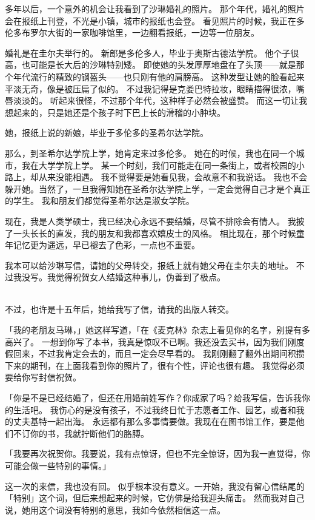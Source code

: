 \documentclass[UTF8]{ctexart}
\begin{document}
多年以后，一个意外的机会让我看到了沙琳婚礼的照片。
那个年代，婚礼的照片会在报纸上刊登，不光是小镇，城市的报纸也会登。
看见照片的时候，我正在多伦多布罗尔大街的一家咖啡馆里，一边翻看报纸，一边等一位朋友。

婚礼是在圭尔夫举行的。
新郎是多伦多人，毕业于奥斯古德法学院。
他个子很高，也可能是长大后的沙琳特别矮。
即使她的头发厚厚地盘在了头顶——就是那个年代流行的精致的钢盔头——也只刚有他的肩膀高。
这种发型让她的脸看起来平淡无奇，像是被压扁了似的。
不过我记得是克娄巴特拉妆，眼睛描得很浓，嘴唇淡淡的。
听起来很怪，不过那个年代，这种样子必然会被盛赞。
而这一切让我想起来的，只是她还是个孩子时下巴上长的滑稽的小肿块。

她，报纸上说的新娘，毕业于多伦多的圣希尔达学院。

那么，到圣希尔达学院上学，她肯定来过多伦多。
她在的时候，我也在同一个城市，我在大学学院上学。
某一个时刻，我们可能走在同一条街上，或者校园的小路上，却从来没能相遇。
我不觉得要是她看见我，会故意不和我说话。
我也不会躲开她。当然了，一旦我得知她在圣希尔达学院上学，一定会觉得自己才是个真正的学生。
我和朋友们都觉得圣希尔达是淑女学院。

现在，我是人类学硕士，我已经决心永远不要结婚，尽管不排除会有情人。
我披了一头长长的直发，我的朋友和我都喜欢嬉皮士的风格。
相比现在，那个时候童年记忆更为遥远，早已褪去了色彩，一点也不重要。

我本可以给沙琳写信，请她的父母转交，报纸上就有她父母在圭尔夫的地址。
不过我没写。我觉得祝贺女人结婚这种事儿，伪善到了极点。

~\\

不过，也许是十五年后，她给我写了信，请我的出版人转交。

「我的老朋友马琳，」她这样写道，「在《麦克林》杂志上看见你的名字，别提有多高兴了。
一想到你写了本书，我真是惊叹不已啊。我还没去买书，因为我们刚度假回来，不过我肯定会去的，而且一定会尽早看的。
我刚刚翻了翻外出期间积攒下来的期刊，在上面我看到你的照片了，很有个性，评论也很有趣。
我觉得必须要给你写封信祝贺。

「你是不是已经结婚了，但还在用婚前姓写作？你成家了吗？给我写信，告诉我你的生活吧。
我伤心的是没有孩子，不过我终日忙于志愿者工作、园艺，或者和我的丈夫基特一起出海。
永远都有那么多事情要做。我现在在图书馆工作，要是他们不订你的书，我就拧断他们的胳膊。

「我要再次祝贺你。我要说，我有点惊讶，但也不完全惊讶，因为我一直觉得，你可能会做一些特别的事情。」

这一次的来信，我也没有回。
似乎根本没有意义。一开始，我没有留心信结尾的「特别」这个词，但后来想起来的时候，它仿佛是给我迎头痛击。
然而我对自己说，她用这个词没有特别的意思，我如今依然相信这一点。
\end{document}
